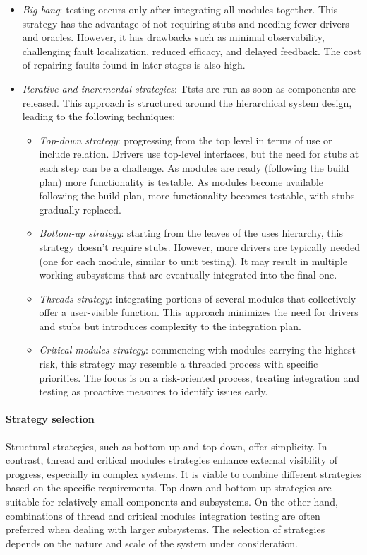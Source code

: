 \begin{itemize}
    \item \textit{Big bang}: testing occurs only after integrating all modules together. 
        This strategy has the advantage of not requiring stubs and needing fewer drivers and oracles. 
        However, it has drawbacks such as minimal observability, challenging fault localization, reduced efficacy, and delayed feedback. 
        The cost of repairing faults found in later stages is also high.
    \item \textit{Iterative and incremental strategies}: Ttsts are run as soon as components are released. 
        This approach is structured around the hierarchical system design, leading to the following techniques:
        \begin{itemize}
            \item \textit{Top-down strategy}: progressing from the top level in terms of use or include relation.
                Drivers use top-level interfaces, but the need for stubs at each step can be a challenge. 
                As modules are ready (following the build plan) more functionality is testable.
                As modules become available following the build plan, more functionality becomes testable, with stubs gradually replaced.
            \item \textit{Bottom-up strategy}: starting from the leaves of the uses hierarchy, this strategy doesn't require stubs.
                However, more drivers are typically needed (one for each module, similar to unit testing). 
                It may result in multiple working subsystems that are eventually integrated into the final one.
            \item \textit{Threads strategy}: integrating portions of several modules that collectively offer a user-visible function. 
                This approach minimizes the need for drivers and stubs but introduces complexity to the integration plan.
            \item \textit{Critical modules strategy}: commencing with modules carrying the highest risk, this strategy may resemble a threaded process with specific priorities. 
                The focus is on a risk-oriented process, treating integration and testing as proactive measures to identify issues early.
        \end{itemize}
\end{itemize}

\paragraph*{Strategy selection}
Structural strategies, such as bottom-up and top-down, offer simplicity. 
In contrast, thread and critical modules strategies enhance external visibility of progress, especially in complex systems. 
It is viable to combine different strategies based on the specific requirements.
Top-down and bottom-up strategies are suitable for relatively small components and subsystems.
On the other hand, combinations of thread and critical modules integration testing are often preferred when dealing with larger subsystems. 
The selection of strategies depends on the nature and scale of the system under consideration.

